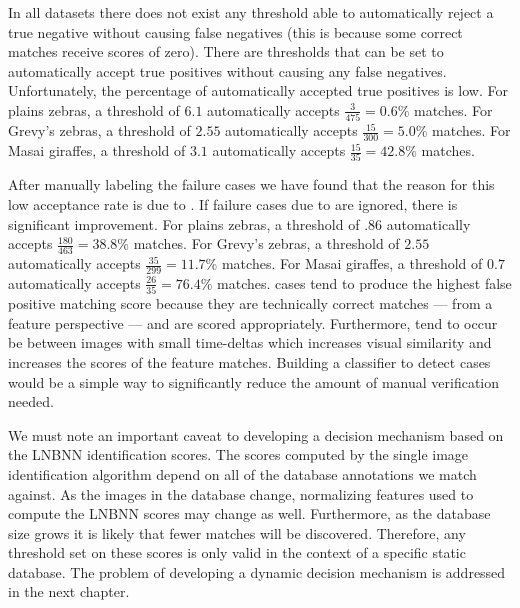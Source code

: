         In all datasets there does not exist any threshold able to
          automatically reject a true negative without causing false
          negatives (this is because some correct matches receive scores
          of zero).
        There are thresholds that can be set to automatically accept
          true positives without causing any false negatives.
        Unfortunately, the percentage of automatically accepted true
          positives is low.
        For plains zebras, a threshold of $6.1$ automatically accepts
          $\frac{3}{475} = 0.6\percent$ \groundtrue{} matches.
        For Grevy's zebras, a threshold of $2.55$ automatically accepts
          $\frac{15}{300} = 5.0\percent$ \groundtrue{} matches.
        For Masai giraffes, a threshold of $3.1$ automatically accepts
          $\frac{15}{35} = 42.8\percent$ \groundtrue{} matches.

        After manually labeling the failure cases we have found that
          the reason for this low acceptance rate is due to
          \photobombings{}.
        If failure cases due to \photobombings{} are ignored, there is
          significant improvement.
        For plains zebras, a threshold of $.86$ automatically accepts
          $\frac{180}{463} = 38.8\percent$ \groundtrue{} matches.
        For Grevy's zebras, a threshold of $2.55$ automatically accepts
          $\frac{35}{299} = 11.7\percent$ \groundtrue{} matches.
        For Masai giraffes, a threshold of $0.7$ automatically accepts
          $\frac{26}{35} = 76.4\percent$ \groundtrue{} matches.
        \Photobombing{} cases tend to produce the highest false
          positive matching score because they are technically correct
          matches --- from a feature perspective --- and are scored
          appropriately.
        Furthermore, \photobombings{} tend to occur be between images
          with small time-deltas which increases visual similarity and
          increases the scores of the feature matches.
        Building a classifier to detect \photobomb{} cases would be a
          simple way to significantly reduce the amount of manual
          verification needed.

        We must note an important caveat to developing a decision
          mechanism based on the LNBNN identification scores.
        The scores computed by the single image identification
          algorithm depend on all of the database annotations we match
          against.
        As the images in the database change, normalizing features used
          to compute the LNBNN scores may change as well.
        Furthermore, as the database size grows it is likely that fewer
          matches will be discovered.
        Therefore, any threshold set on these scores is only valid in
          the context of a specific static database.
        The problem of developing a dynamic decision mechanism is
          addressed in the next chapter.

